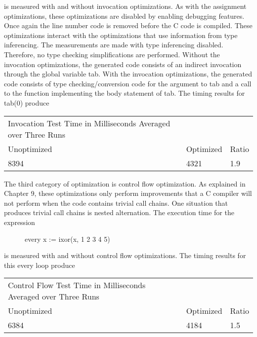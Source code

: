 \noindent is measured with and without invocation optimizations. As
with the assignment optimizations, these optimizations are disabled by
enabling debugging features. Once again the line number code is
removed before the C code is compiled.  These optimizations interact
with the optimizations that use information from type inferencing. The
measurements are made with type inferencing disabled. Therefore, no
type checking simplifications are performed. Without the invocation
optimizations, the generated code consists of an indirect invocation
through the global variable tab. With the invocation optimizations,
the generated code consists of type checking/conversion code for the
argument to tab and a call to the function implementing the body
statement of tab. The timing results for tab(0) produce

\begin{center}
\tablefirsthead{}
\tablehead{}
\tabletail{}
\tablelasttail{}
\begin{supertabular}{m{3.24556in}m{0.6775598in}m{0.34275985in}}
 Invocation Test\newline
Time in Milliseconds Averaged over Three Runs &
~
 &
~
\\
 Unoptimized &
 Optimized &
 Ratio\\
 8394  &
 4321  &
 1.9 \\
\end{supertabular}
\end{center}

The third category of optimization is control flow optimization. As
explained in Chapter 9, these optimizations only perform improvements
that a C compiler will not perform when the code contains trivial call
chains. One situation that produces trivial call chains is nested
alternation. The execution time for the expression

{\ttfamily\mdseries
\ \ \ \ \ \ every x := ixor(x, 1 {\textbar} 2 {\textbar} 3 {\textbar} 4 {\textbar} 5)}

\noindent is measured with and without control flow optimizations. The
timing results for this every loop produce

\begin{center}
\tablefirsthead{}
\tablehead{}
\tabletail{}
\tablelasttail{}
\begin{supertabular}{m{3.2837598in}m{0.6726598in}m{0.36295986in}}
 Control Flow Test\newline
Time in Milliseconds Averaged over Three Runs &
~
 &
~
\\
 Unoptimized &
 Optimized &
 Ratio\\
 6384  &
 4184  &
 1.5 \\
\end{supertabular}
\end{center}

